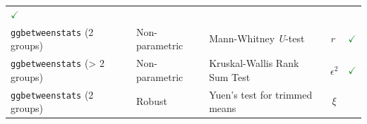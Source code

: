 \documentclass[
]{article}
\begin{document}
\begin{longtable}[]{@{}lllll@{}}
\begin{minipage}[t]{0.07\columnwidth}
\textcolor{ForestGreen}{$\checkmark$}\strut
\end{minipage}\tabularnewline
\begin{minipage}[t]{0.20\columnwidth}\raggedright
\texttt{ggbetweenstats} (2 groups)\strut
\end{minipage} & \begin{minipage}[t]{0.16\columnwidth}\raggedright
Non-parametric\strut
\end{minipage} & \begin{minipage}[t]{0.31\columnwidth}\raggedright
Mann-Whitney \emph{U}-test\strut
\end{minipage} & \begin{minipage}[t]{0.12\columnwidth}\raggedright
\emph{r}\strut
\end{minipage} & \begin{minipage}[t]{0.07\columnwidth}\raggedright
\textcolor{ForestGreen}{$\checkmark$}\strut
\end{minipage}\tabularnewline
\begin{minipage}[t]{0.20\columnwidth}\raggedright
\texttt{ggbetweenstats} (\textgreater{} 2 groups)\strut
\end{minipage} & \begin{minipage}[t]{0.16\columnwidth}\raggedright
Non-parametric\strut
\end{minipage} & \begin{minipage}[t]{0.31\columnwidth}\raggedright
Kruskal-Wallis Rank Sum Test\strut
\end{minipage} & \begin{minipage}[t]{0.12\columnwidth}\raggedright
\[\epsilon^2\]\strut
\end{minipage} & \begin{minipage}[t]{0.07\columnwidth}\raggedright
\textcolor{ForestGreen}{$\checkmark$}\strut
\end{minipage}\tabularnewline
\begin{minipage}[t]{0.20\columnwidth}\raggedright
\texttt{ggbetweenstats} (2 groups)\strut
\end{minipage} & \begin{minipage}[t]{0.16\columnwidth}\raggedright
Robust\strut
\end{minipage} & \begin{minipage}[t]{0.31\columnwidth}\raggedright
Yuen's test for trimmed means\strut
\end{minipage} & \begin{minipage}[t]{0.12\columnwidth}\raggedright
\[\xi\]\strut
\end{minipage} & \begin{minipage}[t]{0.07\columnwidth}\raggedright

\end{minipage}
\end{longtable}
\end{document}
